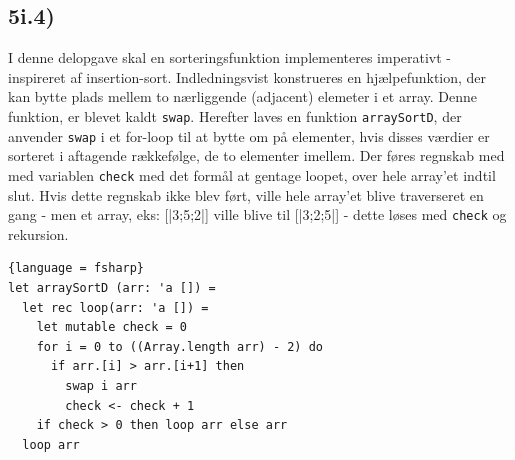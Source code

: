 \documentclass[a4paper,10pt]{article}
\begin{document}
\subsection{5i.4)}
I denne delopgave skal en sorteringsfunktion implementeres imperativt - inspireret af insertion-sort. 
Indledningsvist konstrueres en hjælpefunktion, der kan bytte plads mellem to nærliggende (adjacent) elemeter i et array. Denne funktion, er blevet kaldt \texttt{swap}. Herefter laves en funktion \texttt{arraySortD}, der anvender \texttt{swap} i et for-loop til at bytte om på elementer, hvis disses værdier er sorteret i aftagende rækkefølge, de to elementer imellem. Der føres regnskab med med variablen \texttt{check} med det formål at gentage loopet, over hele array'et indtil slut. Hvis dette regnskab ikke blev ført, ville hele array'et blive traverseret en gang - men et array, eks: [|3;5;2|] ville blive til [|3;2;5|] - dette løses med \texttt{check} og rekursion. 

\begin{lstlisting}{language = fsharp}
let arraySortD (arr: 'a []) = 
  let rec loop(arr: 'a []) = 
    let mutable check = 0 
    for i = 0 to ((Array.length arr) - 2) do
      if arr.[i] > arr.[i+1] then 
        swap i arr 
        check <- check + 1
    if check > 0 then loop arr else arr
  loop arr
\end{lstlisting}
\end{document}
